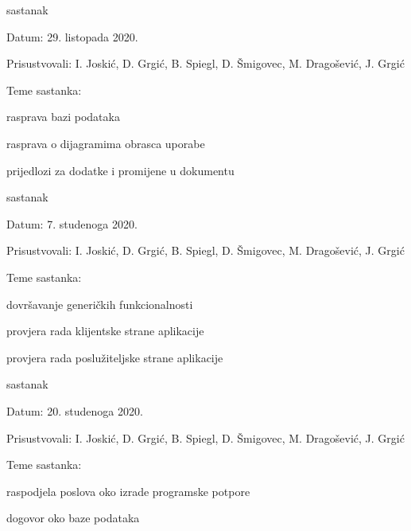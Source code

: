 \begin{packed_enum}
	\item  sastanak
	\item[] \begin{packed_item}
		\item Datum: 29. listopada 2020.
		\item Prisustvovali: I. Joskić, D. Grgić, B. Spiegl, D. Šmigovec, M. Dragošević, J. Grgić
		\item Teme sastanka:
		\begin{packed_item}
			\item  rasprava bazi podataka
			\item  rasprava o dijagramima obrasca uporabe
			\item  prijedlozi za dodatke i promijene u dokumentu
		\end{packed_item}
	\end{packed_item}

	\item  sastanak
	\item[] \begin{packed_item}
		\item Datum: 7. studenoga 2020.
		\item Prisustvovali: I. Joskić, D. Grgić, B. Spiegl, D. Šmigovec, M. Dragošević, J. Grgić
		\item Teme sastanka:
		\begin{packed_item}
			\item  dovršavanje generičkih funkcionalnosti
			\item  provjera rada klijentske strane aplikacije
			\item  provjera rada poslužiteljske strane aplikacije
		\end{packed_item}
	\end{packed_item}

	\item  sastanak
	\item[] \begin{packed_item}
		\item Datum: 20. studenoga 2020.
		\item Prisustvovali: I. Joskić, D. Grgić, B. Spiegl, D. Šmigovec, M. Dragošević, J. Grgić
		\item Teme sastanka:
		\begin{packed_item}
			\item raspodjela poslova oko izrade programske potpore
			\item dogovor oko baze podataka
		\end{packed_item}
	\end{packed_item}


\end{packed_enum}
